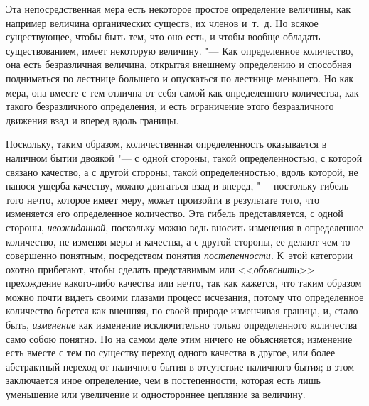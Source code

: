 Эта непосредственная мера есть некоторое простое определение величины, как
например величина органических существ, их членов и~т.~д. Но всякое
существующее, чтобы быть тем, что оно есть, и чтобы вообще обладать
существованием, имеет некоторую величину. "--- Как определенное количество,
она есть безразличная величина, открытая внешнему определению и способная
подниматься по лестнице большего и опускаться по лестнице меньшего. Но как
мера, она вместе с тем отлична от себя самой как определенного количества,
как такого безразличного определения, и есть ограничение этого
безразличного движения взад и вперед вдоль границы.

Поскольку, таким образом, количественная определенность оказывается в
наличном бытии двоякой "--- с одной стороны, такой определенностью, с которой
связано качество, а с другой стороны, такой определенностью, вдоль которой,
не нанося ущерба качеству, можно двигаться взад и вперед, "--- постольку
гибель того нечто, которое имеет меру, может произойти в результате того,
что изменяется его определенное количество. Эта гибель представляется, с
одной стороны, {\em неожиданной}, поскольку можно ведь
вносить изменения в определенное количество, не изменяя меры и качества, а
с другой стороны, ее делают чем-то совершенно понятным, посредством понятия
{\em постепенности}. К~этой категории охотно
прибегают, чтобы сделать представимым или
<<{\em объяснить}>> прехождение какого-либо качества или
нечто, так как кажется, что таким образом можно почти видеть своими глазами
процесс исчезания, потому что определенное количество берется как внешняя,
по своей природе изменчивая граница, и, стало быть,
{\em изменение} как изменение исключительно только
определенного количества само собою понятно. Но на самом деле этим ничего
не объясняется; изменение есть вместе с тем по существу переход одного
качества в другое, или более абстрактный переход от наличного бытия в
отсутствие наличного бытия; в этом заключается иное определение, чем в
постепенности, которая есть лишь уменьшение или увеличение и одностороннее
цепляние за величину.

